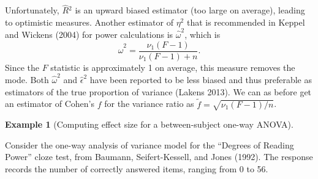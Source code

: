 \documentclass[
  11pt,
  letterpaper,
]{scrbook}
\newenvironment{Shaded}{\begin{snugshade}}{\end{snugshade}}
\newcommand{\AttributeTok}[1]{\textcolor[rgb]{0.40,0.45,0.13}{#1}}
\newcommand{\CommentTok}[1]{\textcolor[rgb]{0.37,0.37,0.37}{#1}}
\newcommand{\DecValTok}[1]{\textcolor[rgb]{0.68,0.00,0.00}{#1}}
\newcommand{\FunctionTok}[1]{\textcolor[rgb]{0.28,0.35,0.67}{#1}}
\newcommand{\NormalTok}[1]{\textcolor[rgb]{0.00,0.23,0.31}{#1}}
\newcommand{\OtherTok}[1]{\textcolor[rgb]{0.00,0.23,0.31}{#1}}
\newcommand{\SpecialCharTok}[1]{\textcolor[rgb]{0.37,0.37,0.37}{#1}}
\newcommand{\StringTok}[1]{\textcolor[rgb]{0.13,0.47,0.30}{#1}}
\theoremstyle{definition}
\theoremstyle{definition}
\newtheorem{example}{Example}[chapter]
\theoremstyle{remark}
\begin{document}
Unfortunately, \(\widehat{R}{}^2\) is an upward biased estimator (too
large on average), leading to optimistic measures. Another estimator of
\(\eta^2\) that is recommended in Keppel and Wickens (2004) for power
calculations is \(\widehat{\omega}^2\), which is
\[\widehat{\omega}^2 = \frac{\nu_1 (F-1)}{\nu_1(F-1)+n}.\] Since the
\(F\) statistic is approximately 1 on average, this measure removes the
mode. Both \(\widehat{\omega}^2\) and \(\widehat{\epsilon}^2\) have been
reported to be less biased and thus preferable as estimators of the true
proportion of variance (Lakens 2013). We can as before get an estimator
of Cohen's \(f\) for the variance ratio as
\(\widetilde{f} = \sqrt{\nu_1(F-1)/n}\).

\begin{example}[Computing effect size for a between-subject one-way
ANOVA]\protect\hypertarget{exm-calculation-effect-anova}{}\label{exm-calculation-effect-anova}

Consider the one-way analysis of variance model for the ``Degrees of
Reading Power'' cloze test, from Baumann, Seifert-Kessell, and Jones
(1992). The response records the number of correctly answered items,
ranging from 0 to 56.

\begin{Shaded}
\end{Shaded}


\end{example}
\end{document}
